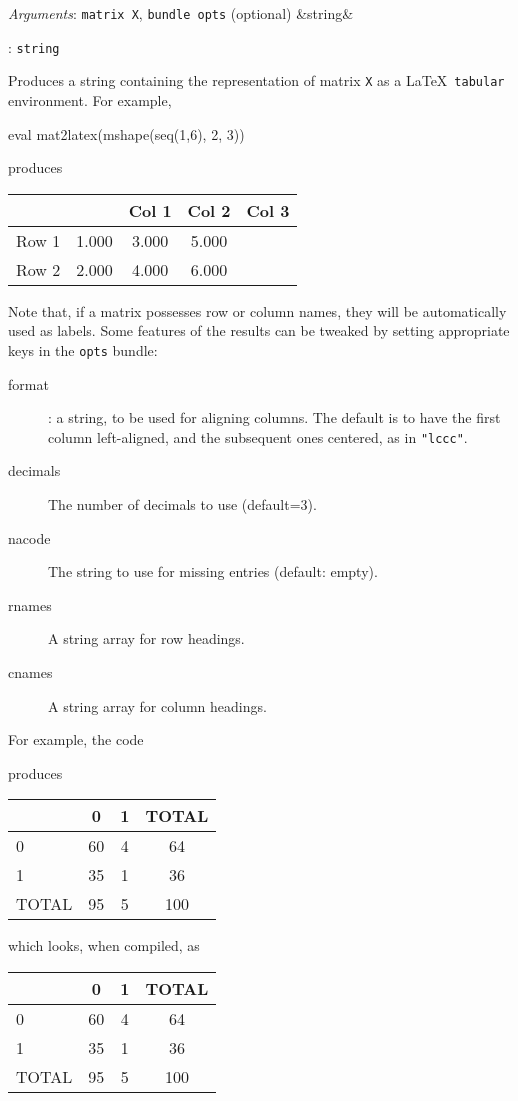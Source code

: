\documentclass[11pt,english]{article}
\newcommand{\ArgRet}[2]{%
  {\it Arguments}: {#1}%
  \ifx&#2&%
  \else
  \par\smallskip\noindent {\it Return type}: \texttt{#2}
  \fi%
  \par\medskip\par%
  }
\begin{document}
\ArgRet{\texttt{matrix X}, \texttt{bundle opts} (optional)}{string}

Produces a string containing the representation of matrix \texttt{X}
as a \LaTeX\ \texttt{tabular} environment. For example,
\begin{code}
eval mat2latex(mshape(seq(1,6), 2, 3))
\end{code}
produces
\begin{code}
\begin{tabular}{lccc}
\hline
 &	  &	 Col 1  &	 Col 2  &	 Col 3 \\ \hline
Row 1 & 1.000	 & 3.000	 & 5.000 \\
Row 2 & 2.000	 & 4.000	 & 6.000 \\
\hline
\end{tabular}
\end{code}
Note that, if a matrix possesses row or column names, they will be
automatically used as labels. Some features of the results can be
tweaked by setting appropriate keys in the \texttt{opts} bundle:
\begin{description}
\item[format]: a string, to be used for aligning columns. The default
  is to have the first column left-aligned, and the subsequent ones
  centered, as in \texttt{"lccc"}.
\item[decimals] The number of decimals to use (default=3).
\item[nacode] The string to use for missing entries (default: empty).
\item[rnames] A string array for row headings.
\item[cnames] A string array for column headings.
\end{description}

For example, the code
produces
\begin{code}
\begin{tabular}{lccc}
\hline
 &	   0  &	    1  &	 TOTAL \\ \hline
   0 & 60	 & 4	 & 64 \\
   1 & 35	 & 1	 & 36 \\
TOTAL & 95	 & 5	 & 100 \\
\hline
\end{tabular}
\end{code}
which looks, when compiled, as
\begin{center}
\begin{tabular}{lccc}
\hline
 &	   0  &	    1  &	 TOTAL \\ \hline
   0 & 60	 & 4	 & 64 \\
   1 & 35	 & 1	 & 36 \\
TOTAL & 95	 & 5	 & 100 \\
\hline
\end{tabular}
\end{center}
\end{document}

